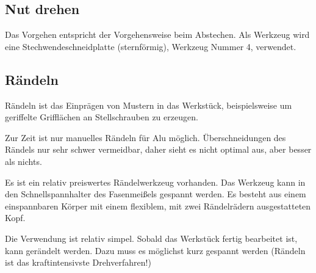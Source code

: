 \documentclass{\basedir/fablab-document}
\begin{document}
\subsection{Nut drehen}

Das Vorgehen entspricht der Vorgehensweise beim Abstechen.
Als Werkzeug wird eine Stechwendeschneidplatte (sternförmig), Werkzeug Nummer 4, verwendet.


\subsection{Rändeln}
\label{handdrehen:raendeln}

Rändeln ist das Einprägen von Mustern in das Werkstück, beispielsweise um geriffelte Grifflächen an Stellschrauben zu erzeugen.

Zur Zeit ist nur manuelles Rändeln für Alu möglich. Überschneidungen des Rändels nur sehr schwer vermeidbar, daher sieht es nicht optimal aus, aber besser als nichts.

Es ist ein relativ preiswertes Rändelwerkzeug vorhanden.
Das Werkzeug kann in den Schnellspannhalter des Fasenmeißels gespannt werden.
Es besteht aus einem einspannbaren Körper mit einem flexiblem, mit zwei Rändelrädern ausgestatteten Kopf.

Die Verwendung ist relativ simpel.
Sobald das Werkstück fertig bearbeitet ist, kann gerändelt werden.
Dazu muss es möglichst kurz gespannt werden (Rändeln ist das kraftintensivste Drehverfahren!)
\end{document}
